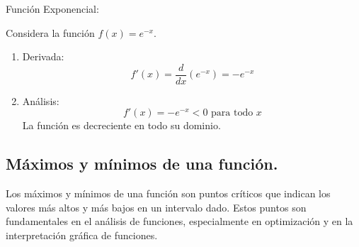 \begin{example}
Función Exponencial:

Considera la función \( f(x) = e^{-x} \).

\begin{enumerate}
    \item Derivada:
    \[
    f'(x) = \frac{d}{dx}(e^{-x}) = -e^{-x}
    \]
    
    \item Análisis:
       \[
       f'(x) = -e^{-x} < 0 \text{ para todo } x
       \]
       La función es decreciente en todo su dominio.
    
\end{enumerate}
   
\begin{center}
\end{center}
\end{example}

\subsection{Máximos y mínimos de una función.}

Los máximos y mínimos de una función son puntos críticos que indican los valores más altos y más bajos en un intervalo dado. Estos puntos son fundamentales en el análisis de funciones, especialmente en optimización y en la interpretación gráfica de funciones.

